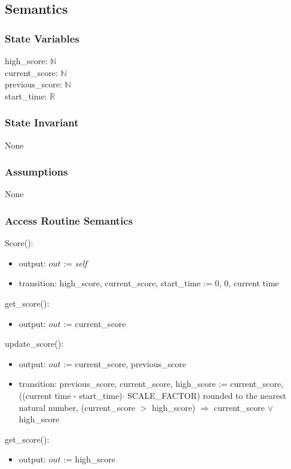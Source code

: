 \documentclass[12pt]{article}
\begin{document}
\subsection* {Semantics}

\subsubsection* {State Variables}

high\_score: $\mathbb{N}$ \\
current\_score: $\mathbb{N}$ \\
previous\_score: $\mathbb{N}$ \\
start\_time: $\mathbb{R}$

\subsubsection* {State Invariant}

None

\subsubsection* {Assumptions}

None

\subsubsection* {Access Routine Semantics}

Score():
\begin{itemize}
    \item output: $out$ := \textit{self} 
    \item transition: high\_score, current\_score, start\_time := 0, 0, current time
\end{itemize}
\noindent get\_score():
\begin{itemize}
    \item output: $out$ := current\_score
\end{itemize}
\noindent update\_score():
\begin{itemize}
    \item output: $out$ := current\_score, previous\_score
    \item transition: previous\_score, current\_score, high\_score := current\_score, ((current time - start\_time)$\cdot$ SCALE\_FACTOR) rounded to the nearest natural number, (current\_score $>$ high\_score) $\Rightarrow$ current\_score $\lor$ high\_score
\end{itemize}
\noindent get\_score():
\begin{itemize}
    \item output: $out$ := high\_score
\end{itemize}
\end{document}
